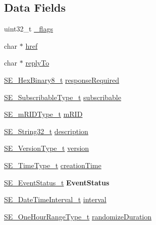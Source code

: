 \subsection*{Data Fields}
\begin{DoxyCompactItemize}
\item 
uint32\+\_\+t \hyperlink{group__TimeTariffInterval_ga7b1863546f7a8bbfb0967abf77ab16be}{\+\_\+flags}
\item 
char $\ast$ \hyperlink{group__TimeTariffInterval_ga9ecb16673577ea0905ad798cff6cddb9}{href}
\item 
char $\ast$ \hyperlink{group__TimeTariffInterval_gadf4d995cb58644749ea7dd25109c6290}{reply\+To}
\item 
\hyperlink{group__HexBinary8_gaecf2dab3615fb954a693c017a61f77d6}{S\+E\+\_\+\+Hex\+Binary8\+\_\+t} \hyperlink{group__TimeTariffInterval_ga6c820fb8d5ca8941778d1d1b72a8db5f}{response\+Required}
\item 
\hyperlink{group__SubscribableType_ga5c41f553d369710ed34619266bf2551e}{S\+E\+\_\+\+Subscribable\+Type\+\_\+t} \hyperlink{group__TimeTariffInterval_ga204d201f3d7f068145fe48b0cf6fef15}{subscribable}
\item 
\hyperlink{group__mRIDType_gac74622112f3a388a2851b2289963ba5e}{S\+E\+\_\+m\+R\+I\+D\+Type\+\_\+t} \hyperlink{group__TimeTariffInterval_ga5dfc94691e8bcb18eeecf048476778ee}{m\+R\+ID}
\item 
\hyperlink{group__String32_gac9f59b06b168b4d2e0d45ed41699af42}{S\+E\+\_\+\+String32\+\_\+t} \hyperlink{group__TimeTariffInterval_gad1653c4c0d6ff772fef6371d9c18aa8b}{description}
\item 
\hyperlink{group__VersionType_ga4b8d27838226948397ed99f67d46e2ae}{S\+E\+\_\+\+Version\+Type\+\_\+t} \hyperlink{group__TimeTariffInterval_ga1dcb279f5b9a99f365184999dcf4183f}{version}
\item 
\hyperlink{group__TimeType_ga6fba87a5b57829b4ff3f0e7638156682}{S\+E\+\_\+\+Time\+Type\+\_\+t} \hyperlink{group__TimeTariffInterval_gafda795062f9aa229e86753763e549e2f}{creation\+Time}
\item 
\hyperlink{structSE__EventStatus__t}{S\+E\+\_\+\+Event\+Status\+\_\+t} {\bfseries Event\+Status}
\item 
\hyperlink{structSE__DateTimeInterval__t}{S\+E\+\_\+\+Date\+Time\+Interval\+\_\+t} \hyperlink{group__TimeTariffInterval_gacacbb719e46c0307212fa42b1401b0bb}{interval}
\item 
\hyperlink{group__OneHourRangeType_ga2b9c57435b20a5fc0689922b77e97c2d}{S\+E\+\_\+\+One\+Hour\+Range\+Type\+\_\+t} \hyperlink{group__TimeTariffInterval_ga81fde071a84cf7021224cb01e53c8c75}{randomize\+Duration}

\end{DoxyCompactItemize}
